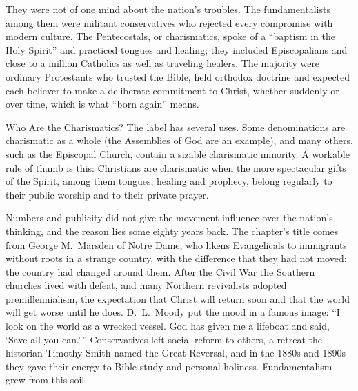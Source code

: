 They were not of one mind about the nation's troubles. The fundamentalists among them were militant
conservatives who rejected every compromise with modern culture. The Pentecostals, or charismatics,
spoke of a ``baptism in the Holy Spirit'' and practiced tongues and healing; they included
Episcopalians and close to a million Catholics as well as traveling healers. The majority were
ordinary Protestants who trusted the Bible, held orthodox doctrine and expected each believer to make
a deliberate commitment to Christ, whether suddenly or over time, which is what ``born again'' means.

\begin{sidebox}{Who Are the Charismatics?}
The label has several uses. Some denominations are charismatic as a whole (the Assemblies of God are
an example), and many others, such as the Episcopal Church, contain a sizable charismatic minority. A
workable rule of thumb is this: Christians are charismatic when the more spectacular gifts of the
Spirit, among them tongues, healing and prophecy, belong regularly to their public worship and to
their private prayer.
\end{sidebox}

Numbers and publicity did not give the movement influence over the nation's thinking, and the reason
lies some eighty years back. The chapter's title comes from George M.~Marsden of Notre Dame, who
likens Evangelicals to immigrants without roots in a strange country, with the difference that they
had not moved: the country had changed around them. After the Civil War the Southern churches lived
with defeat, and many Northern revivalists adopted premillennialism, the expectation that Christ will
return soon and that the world will get worse until he does. D.~L.~Moody put the mood in a famous
image: ``I look on the world as a wrecked vessel. God has given me a lifeboat and said, `Save all you
can.'\,'' Conservatives left social reform to others, a retreat the historian Timothy Smith named the
Great Reversal, and in the 1880s and 1890s they gave their energy to Bible study and personal
holiness. Fundamentalism grew from this soil.

